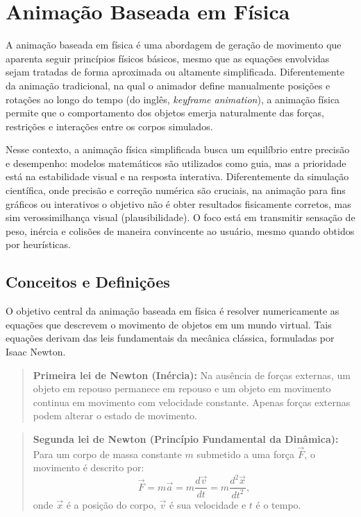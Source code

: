 \chapter{Animação Baseada em Física}

A animação baseada em física é uma abordagem de geração de movimento que aparenta seguir princípios físicos básicos, mesmo que as equações envolvidas sejam tratadas de forma aproximada ou altamente simplificada. Diferentemente da animação tradicional, na qual o animador define manualmente posições e rotações ao longo do tempo (do inglês, \textit{keyframe animation}), a animação física permite que o comportamento dos objetos emerja naturalmente das forças, restrições e interações entre os corpos simulados.

Nesse contexto, a animação física simplificada busca um equilíbrio entre precisão e desempenho: modelos matemáticos são utilizados como guia, mas a prioridade está na estabilidade visual e na resposta interativa. Diferentemente da simulação científica, onde precisão e correção numérica são cruciais, na animação para fins gráficos ou interativos o objetivo não é obter resultados fisicamente corretos, mas sim verossimilhança visual (plausibilidade). O foco está em transmitir sensação de peso, inércia e colisões de maneira convincente ao usuário, mesmo quando obtidos por heurísticas.

\section{Conceitos e Definições}

O objetivo central da animação baseada em física é resolver numericamente as equações que descrevem o movimento de objetos em um mundo virtual. Tais equações derivam das leis fundamentais da mecânica clássica, formuladas por Isaac Newton.

\begin{quote}
	\textbf{Primeira lei de Newton (Inércia):}
	Na ausência de forças externas, um objeto em repouso permanece em repouso e um objeto em movimento continua em movimento com velocidade constante. Apenas forças externas podem alterar o estado de movimento.
\end{quote}

\begin{quote}
	\textbf{Segunda lei de Newton (Princípio Fundamental da Dinâmica):}
	Para um corpo de massa constante $m$ submetido a uma força $\vec F$, o movimento é descrito por:
	$$
		\vec F = m\vec a = m\frac{d\vec v}{dt} = m\frac{d^2\vec x}{dt^2},
	$$
    onde $\vec x$ é a posição do corpo, $\vec v$ é sua velocidade e $t$ é o tempo.
\end{quote}

